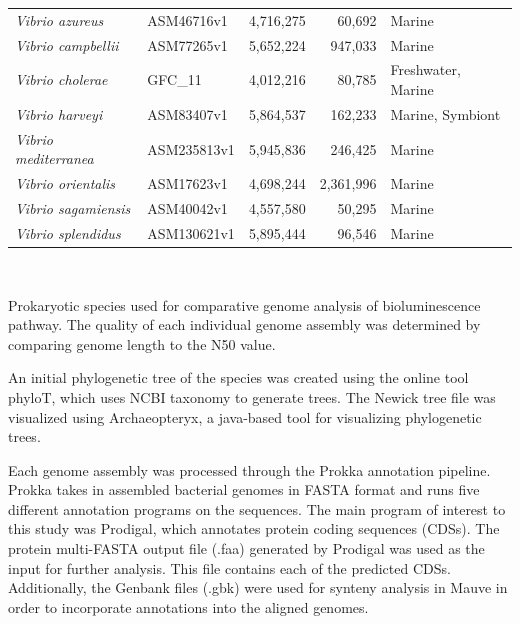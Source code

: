 \documentclass[fleqn,12pt]{wlscirep}
\begin{document}
\begin{table}[!ht]
\begin{tabular}{llrrl}
\textit{Vibrio azureus}                   & ASM46716v1        & 4,716,275            & 60,692     & Marine \cite{25}             \\
\textit{Vibrio campbellii}                & ASM77265v1        & 5,652,224            & 947,033    & Marine \cite{26}             \\
\textit{Vibrio cholerae}                  & GFC\_11           & 4,012,216            & 80,785     & Freshwater, Marine \cite{21} \\
\textit{Vibrio harveyi}                   & ASM83407v1        & 5,864,537            & 162,233    & Marine, Symbiont \cite{21}   \\
\textit{Vibrio mediterranea}              & ASM235813v1       & 5,945,836            & 246,425    & Marine \cite{27}             \\
\textit{Vibrio orientalis}                & ASM17623v1        & 4,698,244            & 2,361,996  & Marine \cite{21}             \\
\textit{Vibrio sagamiensis}               & ASM40042v1        & 4,557,580            & 50,295     & Marine \cite{28}             \\
\textit{Vibrio splendidus}                & ASM130621v1       & 5,895,444            & 96,546     & Marine \cite{22}            
\end{tabular}
\\
\begin{flushleft}Prokaryotic species used for comparative genome analysis of bioluminescence pathway. The quality of each individual genome assembly was determined by comparing genome length to the N50 value.\end{flushleft}
\label{table1}
\end{table}

	An initial phylogenetic tree of the species was created using the online tool phyloT, which uses NCBI taxonomy to generate trees\cite{14}. The Newick tree file was visualized using Archaeopteryx, a java-based tool for visualizing phylogenetic trees\cite{15}.
    
	Each genome assembly was processed through the Prokka annotation pipeline. Prokka takes in assembled bacterial genomes in FASTA format and runs five different annotation programs on the sequences\cite{16}. The main program of interest to this study was Prodigal, which annotates protein coding sequences (CDSs)\cite{17}. The protein multi-FASTA output file (.faa) generated by Prodigal was used as the input for further analysis. This file contains each of the predicted CDSs. Additionally, the Genbank files (.gbk) were used for synteny analysis in Mauve in order to incorporate annotations into the aligned genomes.
    
\end{document}
